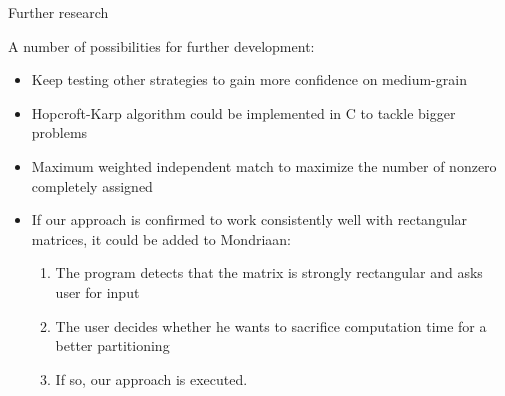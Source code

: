 \documentclass[10pt,serif]{beamer}
\begin{document}
\begin{frame}{Further research}

A number of possibilities for further development:

\begin{itemize}
	\item Keep testing other strategies to gain more confidence on medium-grain
	\item Hopcroft-Karp algorithm could be implemented in C to tackle bigger problems
	\item Maximum weighted independent match to maximize the number of nonzero completely assigned
	\item If our approach is confirmed to work consistently well with rectangular matrices, it could be added to Mondriaan:
		\begin{enumerate}
			\item The program detects that the matrix is strongly rectangular and asks user for input
			\item The user decides whether he wants to sacrifice computation time for a better partitioning
			\item If so, our approach is executed.
		\end{enumerate}
\end{itemize}
	
\end{frame}
\end{document}
